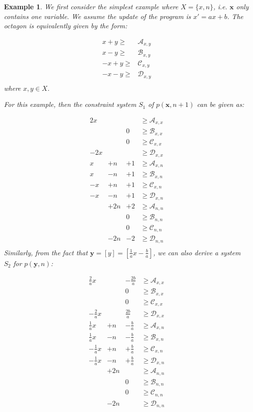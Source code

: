 \documentclass[a4paper,12pt]{article}
\newtheorem{example}{Example}
\newcommand{\cona}{\mathcal{A}}
\newcommand{\conb}{\mathcal{B}}
\newcommand{\conc}{\mathcal{C}}
\newcommand{\cond}{\mathcal{D}}
\begin{document}
\begin{example}

We first consider the simplest example where $X = \{x, n\}$, i.e. $\mathbf{x}$ only contains one variable. We assume the update of the program is $x' = ax + b$. The octagon is equivalently given by the form:


\begin{align*}
x + y \ge& \cona_{x,y}\\
x - y \ge& \conb_{x,y}\\
-x + y \ge& \conc_{x,y}\\
-x - y \ge& \cond_{x,y}\\
\end{align*}
where $x,y\in X$.

For this example, then the constraint system $S_1$ of $p(\mathbf{x}, n+1)$ can be given as:

\begin{align*}
2x&& &\ge \cona_{x,x}\\
&&0 &\ge \conb_{x,x}\\
&&0 &\ge \conc_{x,x}\\
-2x&& & \ge \cond_{x,x}\\
x &+ n& +1&\ge \cona_{x,n}\\
x &- n& +1&\ge \conb_{x,n}\\
-x &+ n& +1&\ge \conc_{x,n}\\
-x &- n&+1 &\ge \cond_{x,n}\\
&+2n & +2&\ge \cona_{n,n}\\
&& 0&\ge \conb_{n,n}\\
&& 0&\ge \conc_{n,n}\\
&-2n& -2&\ge\cond_{n,n}\\
\end{align*}
Similarly, from the fact that $\mathbf{y} = [y] = [\frac{1}{a} x - \frac{b}{a}]$, we can also derive a system $S_2$ for $p(\mathbf{y}, n)$:

\begin{align*}
\frac{2}{a}x&& -\frac{2b}{a} &\ge \cona_{x,x}\\
&&0 &\ge \conb_{x,x}\\
&&0 &\ge \conc_{x,x}\\
-\frac{2}{a}x&& \frac{2b}{a} &\ge \cond_{x,x}\\
\frac{1}{a}x &+ n& -\frac{b}{a}&\ge \cona_{x,n}\\
\frac{1}{a}x &- n& -\frac{b}{a}&\ge \conb_{x,n}\\
-\frac{1}{a}x &+ n& +\frac{b}{a}&\ge \conc_{x,n}\\
-\frac{1}{a}x &- n& +\frac{b}{a}&\ge \cond_{x,n}\\
&+2n &&\ge \cona_{n,n}\\
&& 0&\ge \conb_{n,n}\\
&& 0&\ge \conc_{n,n}\\
&-2n&&\ge\cond_{n,n}\\
\end{align*}


\end{example}
\end{document}

